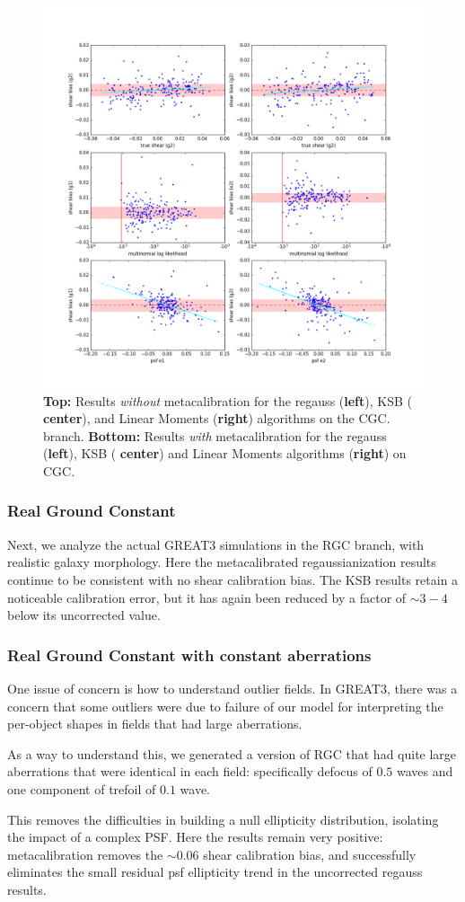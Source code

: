 \documentclass[iop]{emulateapj}
\begin{document}
\begin{figure}[t]
\begin{center}
\includegraphics[width=0.32\linewidth]{./Plots/moments-opt-shear_plots.png}
\end{center}
\caption{{\bf Top:} Results {\it without} metacalibration for the regauss ({\bf left}), KSB ({\bf
    center}), and Linear Moments ({\bf right}) algorithms on the CGC.
  branch.  {\bf Bottom:} Results {\it with} metacalibration for the regauss ({\bf left}), KSB ({\bf
    center}) and Linear Moments algorithms ({\bf right}) on CGC.}
\label{fig:cgc_corrected}
\end{figure}




\subsubsection{Real Ground Constant}

Next, we analyze the actual GREAT3 simulations in the RGC branch, with
realistic galaxy morphology. Here the metacalibrated regaussianization
results continue to be consistent with no shear calibration bias. The
KSB results retain a noticeable calibration error, but it has again
been reduced by a factor of $\sim3-4$ below its uncorrected value. 



\subsubsection{Real Ground Constant with constant aberrations}

One issue of concern is how to understand outlier fields.  In GREAT3,
there was a concern that some outliers were due to failure of our
model for interpreting the per-object shapes in fields that had large
aberrations.

As a way to understand this, we generated a version of RGC that had
quite large aberrations that were identical in each field:
specifically defocus of $0.5$ waves and one component of trefoil of
$0.1$ wave.

This removes the difficulties in building a null ellipticity
distribution, isolating the impact of a complex PSF. Here the results
remain very positive: metacalibration removes the $\sim0.06$ shear
calibration bias, and successfully eliminates the small residual psf
ellipticity trend in the uncorrected regauss results.
\end{document}
